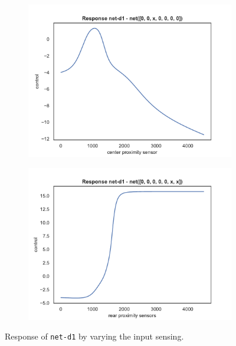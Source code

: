 \begin{figure}[!htb]
	\centering
	\begin{subfigure}[h]{0.49\textwidth}
		\centering
		\includegraphics[width=\textwidth]{contents/images/net-d1/response-net-d1-front}%
	\end{subfigure}
	\hfill
	\begin{subfigure}[h]{0.49\textwidth}
		\centering
		\includegraphics[width=\textwidth]{contents/images/net-d1/response-net-d1-rear}
	\end{subfigure}
	\caption[Response of \texttt{net-d1} by varying the input sensing.]{Response of 
		\texttt{net-d1} by varying the input sensing.}
	\label{fig:net-d1responsesensors}
\end{figure}

